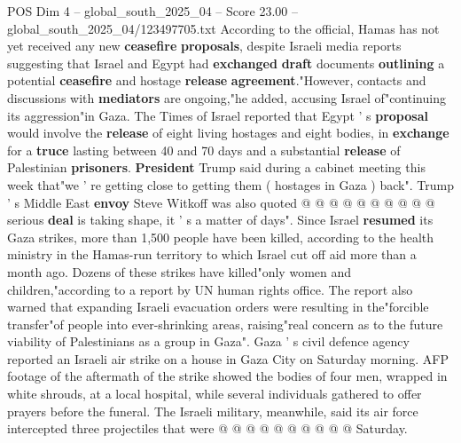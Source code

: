 \begin{textsample}{POS Dim 4 – global\_south\_2025\_04 – Score 23.00 – global\_south\_2025\_04/123497705.txt}
According to the official, Hamas has not yet received any new \textbf{ceasefire} \textbf{proposals}, despite Israeli media reports suggesting that Israel and Egypt had \textbf{exchanged} \textbf{draft} documents \textbf{outlining} a potential \textbf{ceasefire} and hostage \textbf{release} \textbf{agreement}."However, contacts and discussions with \textbf{mediators} are ongoing,"he added, accusing Israel of"continuing its aggression"in Gaza.
The Times of Israel reported that Egypt ' s \textbf{proposal} would involve the \textbf{release} of eight living hostages and eight bodies, in \textbf{exchange} for a \textbf{truce} lasting between 40 and 70 days and a substantial \textbf{release} of Palestinian \textbf{prisoners}. \textbf{President} Trump said during a cabinet meeting this week that"we ' re getting close to getting them ( hostages in Gaza ) back".
Trump ' s Middle East \textbf{envoy} Steve Witkoff was also quoted @ @ @ @ @ @ @ @ @ @ serious \textbf{deal} is taking shape, it ' s a matter of days".
Since Israel \textbf{resumed} its Gaza strikes, more than 1,500 people have been killed, according to the health ministry in the Hamas-run territory to which Israel cut off aid more than a month ago.
Dozens of these strikes have killed"only women and children,"according to a report by UN human rights office.
The report also warned that expanding Israeli evacuation orders were resulting in the"forcible transfer"of people into ever-shrinking areas, raising"real concern as to the future viability of Palestinians as a group in Gaza".
Gaza ' s civil defence agency reported an Israeli air strike on a house in Gaza City on Saturday morning.
AFP footage of the aftermath of the strike showed the bodies of four men, wrapped in white shrouds, at a local hospital, while several individuals gathered to offer prayers before the funeral.
The Israeli military, meanwhile, said its air force intercepted three projectiles that were @ @ @ @ @ @ @ @ @ @ Saturday.

\end{textsample}
